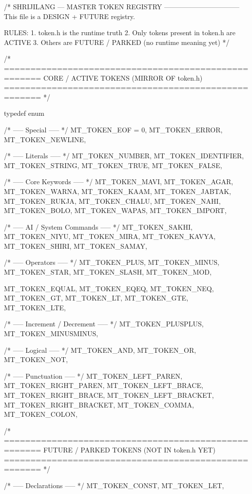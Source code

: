 \documentclass{article}
\begin{document}
/*
  SHRIJILANG — MASTER TOKEN REGISTRY
  ---------------------------------
  This file is a DESIGN + FUTURE registry.

  RULES:
  1. token.h is the runtime truth
  2. Only tokens present in token.h are ACTIVE
  3. Others are FUTURE / PARKED (no runtime meaning yet)
*/

/* =====================================================
   CORE / ACTIVE TOKENS (MIRROR OF token.h)
   ===================================================== */

typedef enum {

    /* ----- Special ----- */
    MT_TOKEN_EOF = 0,
    MT_TOKEN_ERROR,
    MT_TOKEN_NEWLINE,

    /* ----- Literals ----- */
    MT_TOKEN_NUMBER,
    MT_TOKEN_IDENTIFIER,
    MT_TOKEN_STRING,
    MT_TOKEN_TRUE,
    MT_TOKEN_FALSE,

    /* ----- Core Keywords ----- */
    MT_TOKEN_MAVI,
    MT_TOKEN_AGAR,
    MT_TOKEN_WARNA,
    MT_TOKEN_KAAM,
    MT_TOKEN_JABTAK,
    MT_TOKEN_RUKJA,
    MT_TOKEN_CHALU,
    MT_TOKEN_NAHI,
    MT_TOKEN_BOLO,
    MT_TOKEN_WAPAS,
    MT_TOKEN_IMPORT,

    /* ----- AI / System Commands ----- */
    MT_TOKEN_SAKHI,
    MT_TOKEN_NIYU,
    MT_TOKEN_MIRA,
    MT_TOKEN_KAVYA,
    MT_TOKEN_SHIRI,
    MT_TOKEN_SAMAY,

    /* ----- Operators ----- */
    MT_TOKEN_PLUS,
    MT_TOKEN_MINUS,
    MT_TOKEN_STAR,
    MT_TOKEN_SLASH,
    MT_TOKEN_MOD,

    MT_TOKEN_EQUAL,
    MT_TOKEN_EQEQ,
    MT_TOKEN_NEQ,
    MT_TOKEN_GT,
    MT_TOKEN_LT,
    MT_TOKEN_GTE,
    MT_TOKEN_LTE,

    /* ----- Increment / Decrement ----- */
    MT_TOKEN_PLUSPLUS,
    MT_TOKEN_MINUSMINUS,

    /* ----- Logical ----- */
    MT_TOKEN_AND,
    MT_TOKEN_OR,
    MT_TOKEN_NOT,

    /* ----- Punctuation ----- */
    MT_TOKEN_LEFT_PAREN,
    MT_TOKEN_RIGHT_PAREN,
    MT_TOKEN_LEFT_BRACE,
    MT_TOKEN_RIGHT_BRACE,
    MT_TOKEN_LEFT_BRACKET,
    MT_TOKEN_RIGHT_BRACKET,
    MT_TOKEN_COMMA,
    MT_TOKEN_COLON,

/* =====================================================
   FUTURE / PARKED TOKENS (NOT IN token.h YET)
   ===================================================== */

    /* ----- Declarations ----- */
    MT_TOKEN_CONST,
    MT_TOKEN_LET,

}
\end{document}
